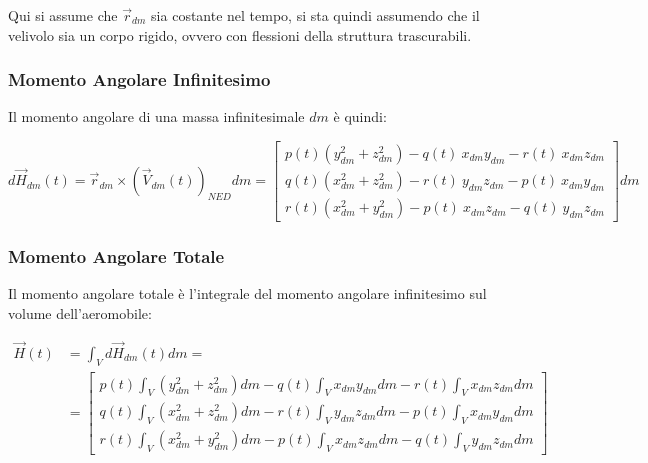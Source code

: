 \begin{note}
    Qui si assume che $\vec{r}_{dm}$ sia costante nel tempo, si sta quindi assumendo che il velivolo sia un corpo rigido, ovvero con flessioni della struttura trascurabili.
\end{note}

\subsubsection{Momento Angolare Infinitesimo}
Il momento angolare di una massa infinitesimale $dm$ è quindi:

\begin{equation*}
    d\vec{H}_{dm}(t) = \vec{r}_{dm}\times \left(\vec{V}_{dm}(t)\right)_{NED} dm = \begin{bmatrix}
        p(t)\left(y_{dm}^2 + z_{dm}^2\right) - q(t)\:x_{dm}y_{dm} - r(t)\:x_{dm}z_{dm} \\
        q(t)\left(x_{dm}^2 + z_{dm}^2\right) - r(t)\:y_{dm}z_{dm} - p(t)\:x_{dm}y_{dm} \\
        r(t)\left(x_{dm}^2 + y_{dm}^2\right) - p(t)\:x_{dm}z_{dm} - q(t)\:y_{dm}z_{dm}
    \end{bmatrix} dm
\end{equation*}

\subsubsection{Momento Angolare Totale}
Il momento angolare totale è l'integrale del momento angolare infinitesimo sul volume dell'aeromobile:

\begin{align*}
    \vec{H}(t) & = \int_{V} d\vec{H}_{dm}(t) dm = \\ &= \begin{bmatrix}
        p(t)\int_V\left(y_{dm}^2 + z_{dm}^2\right) dm - q(t)\int_Vx_{dm}y_{dm}dm - r(t)\int_Vx_{dm}z_{dm}dm \\
        q(t)\int_V\left(x_{dm}^2 + z_{dm}^2\right) dm - r(t)\int_Vy_{dm}z_{dm}dm - p(t)\int_Vx_{dm}y_{dm}dm \\
        r(t)\int_V\left(x_{dm}^2 + y_{dm}^2\right) dm - p(t)\int_Vx_{dm}z_{dm}dm - q(t)\int_Vy_{dm}z_{dm}dm
    \end{bmatrix}
\end{align*}

